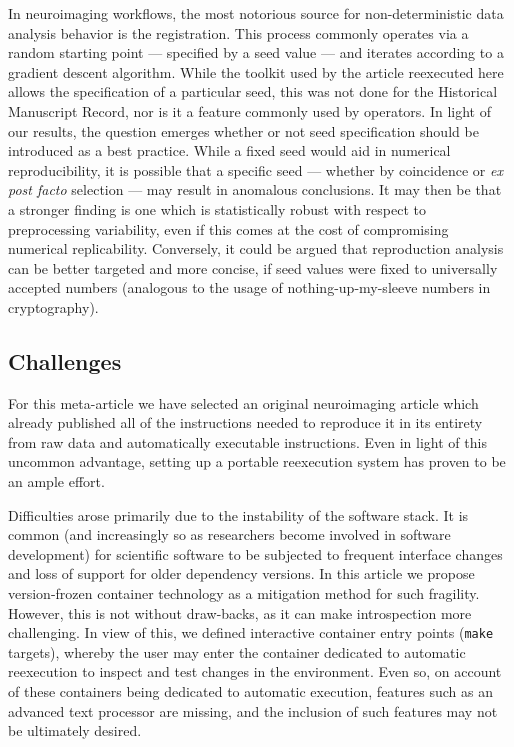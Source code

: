 In neuroimaging workflows, the most notorious source for non-deterministic data analysis behavior is the registration.
This process commonly operates via a random starting point — specified by a seed value — and iterates according to a gradient descent algorithm.
While the toolkit used by the article reexecuted here allows the specification of a particular seed, this was not done for the Historical Manuscript Record, nor is it a feature commonly used by operators.
In light of our results, the question emerges whether or not seed specification should be introduced as a best practice.
While a fixed seed would aid in numerical reproducibility, it is possible that a specific seed — whether by coincidence or \textit{ex post facto} selection — may result in anomalous conclusions.
It may then be that a stronger finding is one which is statistically robust with respect to preprocessing variability, even if this comes at the cost of compromising numerical replicability.
Conversely, it could be argued that reproduction analysis can be better targeted and more concise, if seed values were fixed to universally accepted numbers (analogous to the usage of nothing-up-my-sleeve numbers in cryptography).

\subsection{Challenges}
For this meta-article we have selected an original neuroimaging article which already published all of the instructions needed to reproduce it in its entirety from raw data and automatically executable instructions.
Even in light of this uncommon advantage, setting up a portable reexecution system has proven to be an ample effort.

Difficulties arose primarily due to the instability of the software stack.
It is common (and increasingly so as researchers become involved in software development) for scientific software to be subjected to frequent interface changes and loss of support for older dependency versions.
In this article we propose version-frozen container technology as a mitigation method for such fragility.
However, this is not without draw-backs, as it can make introspection more challenging.
In view of this, we defined interactive container entry points (\texttt{make} targets), whereby the user may enter the container dedicated to automatic reexecution to inspect and test changes in the environment.
Even so, on account of these containers being dedicated to automatic execution, features such as an advanced text processor are missing, and the inclusion of such features may not be ultimately desired.

